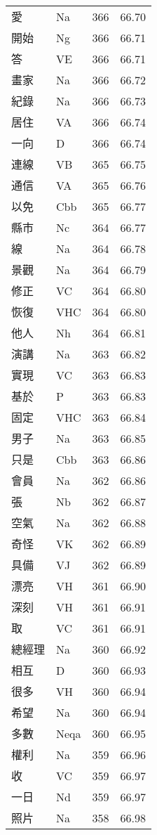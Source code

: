 \documentclass[twocolumn]{book}
\begin{document}
\begin{supertabular}{llrr}
愛 & Na & 366 &  66.70\\
開始 & Ng & 366 &  66.71\\
答 & VE & 366 &  66.71\\
畫家 & Na & 366 &  66.72\\
紀錄 & Na & 366 &  66.73\\
居住 & VA & 366 &  66.74\\
一向 & D & 366 &  66.74\\
連線 & VB & 365 &  66.75\\
通信 & VA & 365 &  66.76\\
以免 & Cbb & 365 &  66.77\\
縣市 & Nc & 364 &  66.77\\
線 & Na & 364 &  66.78\\
景觀 & Na & 364 &  66.79\\
修正 & VC & 364 &  66.80\\
恢復 & VHC & 364 &  66.80\\
他人 & Nh & 364 &  66.81\\
演講 & Na & 363 &  66.82\\
實現 & VC & 363 &  66.83\\
基於 & P & 363 &  66.83\\
固定 & VHC & 363 &  66.84\\
男子 & Na & 363 &  66.85\\
只是 & Cbb & 363 &  66.86\\
會員 & Na & 362 &  66.86\\
張 & Nb & 362 &  66.87\\
空氣 & Na & 362 &  66.88\\
奇怪 & VK & 362 &  66.89\\
具備 & VJ & 362 &  66.89\\
漂亮 & VH & 361 &  66.90\\
深刻 & VH & 361 &  66.91\\
取 & VC & 361 &  66.91\\
總經理 & Na & 360 &  66.92\\
相互 & D & 360 &  66.93\\
很多 & VH & 360 &  66.94\\
希望 & Na & 360 &  66.94\\
多數 & Neqa & 360 &  66.95\\
權利 & Na & 359 &  66.96\\
收 & VC & 359 &  66.97\\
一日 & Nd & 359 &  66.97\\
照片 & Na & 358 &  66.98\\

\end{supertabular}
\end{document}
